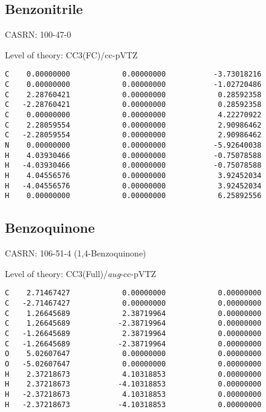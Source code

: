 \documentclass[journal=jctcce,manuscript=article,layout=traditional]{achemso}
\newcommand{\TZ}{cc-pVTZ}
\newcommand{\AVTZ}{\emph{aug}-cc-pVTZ}
\begin{document}
\subsection{Benzonitrile}

CASRN: 100-47-0

\begin{singlespace}
\noindent  Level of theory: CC3(FC)/{\TZ}
\begin{verbatim}
C    0.00000000            0.00000000           -3.73018216
C    0.00000000            0.00000000           -1.02720486
C    2.28760421            0.00000000            0.28592358
C   -2.28760421            0.00000000            0.28592358
C    0.00000000            0.00000000            4.22270922
C    2.28059554            0.00000000            2.90986462
C   -2.28059554            0.00000000            2.90986462
N    0.00000000            0.00000000           -5.92640038
H    4.03930466            0.00000000           -0.75078588
H   -4.03930466            0.00000000           -0.75078588
H    4.04556576            0.00000000            3.92452034
H   -4.04556576            0.00000000            3.92452034
H    0.00000000            0.00000000            6.25892556
\end{verbatim}
\end{singlespace}

\subsection{Benzoquinone}

CASRN: 106-51-4 (1,4-Benzoquinone)

\begin{singlespace}
\noindent  Level of theory: CC3(Full)/{\AVTZ}
\begin{verbatim}
C    2.71467427            0.00000000            0.00000000
C   -2.71467427            0.00000000            0.00000000
C    1.26645689            2.38719964            0.00000000
C    1.26645689           -2.38719964            0.00000000
C   -1.26645689            2.38719964            0.00000000
C   -1.26645689           -2.38719964            0.00000000
O    5.02607647            0.00000000            0.00000000
O   -5.02607647            0.00000000            0.00000000
H    2.37218673            4.10318853            0.00000000
H    2.37218673           -4.10318853            0.00000000
H   -2.37218673            4.10318853            0.00000000
H   -2.37218673           -4.10318853            0.00000000
\end{verbatim}
\end{singlespace}
\end{document}
